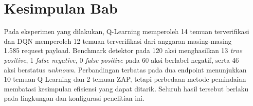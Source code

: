 \section{Kesimpulan Bab}

Pada eksperimen yang dilakukan, Q-Learning memperoleh 14 temuan terverifikasi dan DQN memperoleh 12 temuan terverifikasi dari anggaran masing-masing 1.585 request payload. Benchmark detektor pada 120 aksi menghasilkan 13 \textit{true positive}, 1 \textit{false negative}, 0 \textit{false positive} pada 60 aksi berlabel negatif, serta 46 aksi berstatus \textit{unknown}. Perbandingan terbatas pada dua endpoint menunjukkan 10 temuan Q-Learning dan 2 temuan ZAP, tetapi perbedaan metode pemindaian membatasi kesimpulan efisiensi yang dapat ditarik. Seluruh hasil tersebut berlaku pada lingkungan dan konfigurasi penelitian ini.



